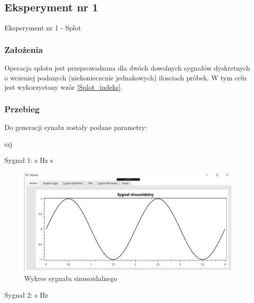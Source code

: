 \documentclass[12pt]{article}
\begin{document}
\subsection{Eksperyment nr 1}

Eksperyment nr 1 -  Splot\\


\subsubsection{Założenia}
Operacja splotu jest przeprowadzana dla dwóch dowolnych sygnałów dyskretnych o wczeniej podanych (niekonieczcnie jednakowych) ilosciach próbek. W tym celu jest wykorzystany wzór \ref{Splot_indeks}.

\subsubsection{Przebieg}
Do generacji synału zostały podane parametry:

\begin{labeling}{szj}
\item [Sygnał 1:]
 s
 Hz
 s

\begin{figure}[h!]
 \centering
 \includegraphics[width=12.3cm]{sin.PNG}
 \vspace{-0.3cm}
 \caption{Wykres sygnału sinusoidalnego}
 \label{sin}
\end{figure}

\item [Sygnał 2:]
 s
 Hz

\end{labeling}
\end{document}
